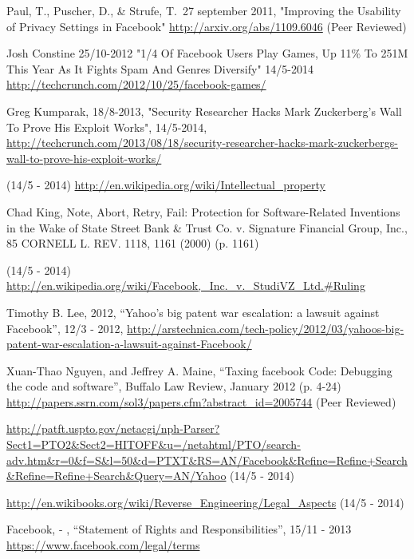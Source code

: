 \documentclass[conference]{IEEEtran}
\begin{document}
\begin{thebibliography}{1}
 Paul, T., Puscher, D.,
\& Strufe, T.\ 27 september 2011,
"Improving the Usability of Privacy Settings in Facebook"
\href{http://arxiv.org/abs/1109.6046}{http://arxiv.org/abs/1109.6046} (Peer Reviewed)

Josh Constine
25/10-2012
"1/4 Of Facebook Users Play Games, Up 11\% To 251M This Year As It Fights Spam And Genres Diversify"
14/5-2014
\href{http://techcrunch.com/2012/10/25/facebook-games/}{http://techcrunch.com/2012/10/25/facebook-games/}

Greg Kumparak,
18/8-2013,
"Security Researcher Hacks Mark Zuckerberg’s Wall To Prove His Exploit Works",
14/5-2014,
\href{http://techcrunch.com/2013/08/18/security-researcher-hacks-mark-zuckerbergs-wall-to-prove-his-exploit-works/}{http://techcrunch.com/2013/08/18/security-researcher-hacks-mark-zuckerbergs-wall-to-prove-his-exploit-works/}

 (14/5 - 2014)
\url{http://en.wikipedia.org/wiki/Intellectual\_property}

Chad King, Note, Abort, Retry, Fail: Protection for Software-Related Inventions in the Wake of State Street Bank \& Trust Co. v. Signature Financial Group, Inc., 85 CORNELL L. REV. 1118, 1161 (2000) (p. 1161)

(14/5 - 2014)
\url{http://en.wikipedia.org/wiki/Facebook,\_Inc.\_v.\_StudiVZ\_Ltd.#Ruling}

Timothy B. Lee, 2012, “Yahoo’s big patent war escalation: a lawsuit against Facebook”, 12/3 - 2012,
\url{http://arstechnica.com/tech-policy/2012/03/yahoos-big-patent-war-escalation-a-lawsuit-against-Facebook/}

Xuan-Thao Nguyen, and Jeffrey A. Maine, “Taxing facebook Code: Debugging the
code and software”, Buffalo Law Review, January 2012 (p. 4-24)
\url{http://papers.ssrn.com/sol3/papers.cfm?abstract\_id=2005744} (Peer Reviewed)

\url{http://patft.uspto.gov/netacgi/nph-Parser?Sect1=PTO2\&Sect2=HITOFF\&u=/netahtml/PTO/search-adv.htm\&r=0\&f=S\&l=50\&d=PTXT\&RS=AN/Facebook\&Refine=Refine+Search\&Refine=Refine+Search\&Query=AN/Yahoo} (14/5 - 2014)

\url{http://en.wikibooks.org/wiki/Reverse\_Engineering/Legal\_Aspects} (14/5 - 2014)

Facebook, - , “Statement of Rights and Responsibilities”, 15/11 - 2013
\url{https://www.facebook.com/legal/terms}


\end{thebibliography}
\end{document}
